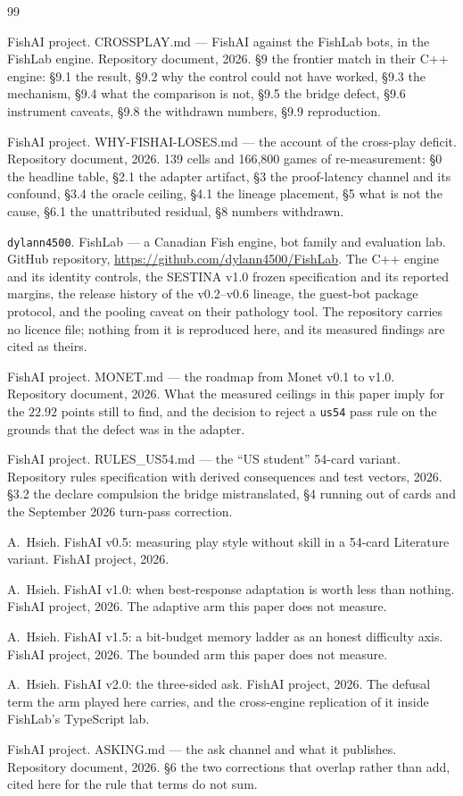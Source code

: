 \documentclass[11pt]{article}
\newcommand{\code}[1]{\texttt{#1}}
\newcommand{\usff}{\code{us54}}
\begin{document}
\begin{thebibliography}{99}
\footnotesize

FishAI project. CROSSPLAY.md --- FishAI against the FishLab bots, in the FishLab engine. Repository
document, 2026. \S9 the frontier match in their C++ engine: \S9.1 the result, \S9.2 why the control
could not have worked, \S9.3 the mechanism, \S9.4 what the comparison is not, \S9.5 the bridge
defect, \S9.6 instrument caveats, \S9.8 the withdrawn numbers, \S9.9 reproduction.

FishAI project. WHY-FISHAI-LOSES.md --- the account of the cross-play deficit. Repository document,
2026. 139 cells and 166{,}800 games of re-measurement: \S0 the headline table, \S2.1 the adapter
artifact, \S3 the proof-latency channel and its confound, \S3.4 the oracle ceiling, \S4.1 the
lineage placement, \S5 what is not the cause, \S6.1 the unattributed residual, \S8 numbers
withdrawn.

\code{dylann4500}. FishLab --- a Canadian Fish engine, bot family and evaluation lab. GitHub
repository, \url{https://github.com/dylann4500/FishLab}. The C++ engine and its identity controls,
the SESTINA v1.0 frozen specification and its reported margins, the release history of the
v0.2--v0.6 lineage, the guest-bot package protocol, and the pooling caveat on their pathology tool.
The repository carries no licence file; nothing from it is reproduced here, and its measured
findings are cited as theirs.

FishAI project. MONET.md --- the roadmap from Monet v0.1 to v1.0. Repository document, 2026. What
the measured ceilings in this paper imply for the $22.92$ points still to find, and the decision to
reject a \usff{} pass rule on the grounds that the defect was in the adapter.

FishAI project. RULES\_US54.md --- the ``US student'' 54-card variant. Repository rules
specification with derived consequences and test vectors, 2026. \S3.2 the declare compulsion the
bridge mistranslated, \S4 running out of cards and the September 2026 turn-pass correction.

A.~Hsieh. FishAI v0.5: measuring play style without skill in a 54-card Literature variant. FishAI
project, 2026.

A.~Hsieh. FishAI v1.0: when best-response adaptation is worth less than nothing. FishAI project,
2026. The adaptive arm this paper does not measure.

A.~Hsieh. FishAI v1.5: a bit-budget memory ladder as an honest difficulty axis. FishAI project,
2026. The bounded arm this paper does not measure.

A.~Hsieh. FishAI v2.0: the three-sided ask. FishAI project, 2026. The defusal term the arm played
here carries, and the cross-engine replication of it inside FishLab's TypeScript lab.

FishAI project. ASKING.md --- the ask channel and what it publishes. Repository document, 2026.
\S6 the two corrections that overlap rather than add, cited here for the rule that terms do not sum.

\end{thebibliography}
\end{document}
